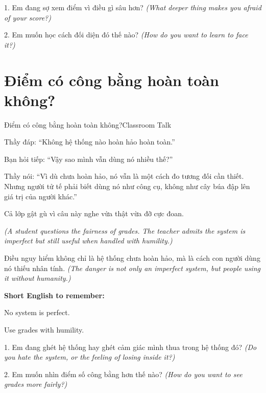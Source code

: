 \begin{tuhocnhanh}
1. Em đang sợ xem điểm vì điều gì sâu hơn? \textit{(What deeper thing makes you afraid of your score?)}

2. Em muốn học cách đối diện đó thế nào? \textit{(How do you want to learn to face it?)}
\end{tuhocnhanh}
\ngancach

\section{Điểm có công bằng hoàn toàn không?}
\begin{truyen}{Điểm có công bằng hoàn toàn không?}{Classroom Talk}

Thầy đáp: ``Không hệ thống nào hoàn hảo hoàn toàn.''

Bạn hỏi tiếp: ``Vậy sao mình vẫn dùng nó nhiều thế?''

Thầy nói: ``Vì dù chưa hoàn hảo, nó vẫn là một cách đo tương đối cần thiết. Nhưng người tử tế phải biết dùng nó như công cụ, không như cây búa đập lên giá trị của người khác.''

Cả lớp gật gù vì câu này nghe vừa thật vừa đỡ cực đoan.

\textit{(A student questions the fairness of grades. The teacher admits the system is imperfect but still useful when handled with humility.)}
\end{truyen}

\begin{baihoc}
Điều nguy hiểm không chỉ là hệ thống chưa hoàn hảo, mà là cách con người dùng nó thiếu nhân tính.
\textit{(The danger is not only an imperfect system, but people using it without humanity.)}
\end{baihoc}

\begin{ghinhoanh}
\textbf{Short English to remember:}

No system is perfect.

Use grades with humility.
\end{ghinhoanh}

\begin{tuhocnhanh}
1. Em đang ghét hệ thống hay ghét cảm giác mình thua trong hệ thống đó? \textit{(Do you hate the system, or the feeling of losing inside it?)}

2. Em muốn nhìn điểm số công bằng hơn thế nào? \textit{(How do you want to see grades more fairly?)}
\end{tuhocnhanh}
\ngancach


